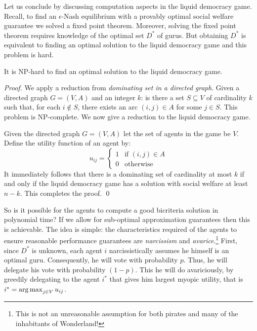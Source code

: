 Let us conclude by discussing computation aspects in the liquid democracy game.
Recall, to find an $\epsilon$-Nash equilibrium with a provably optimal social welfare guarantee
we solved a fixed point theorem. 
Moreover, solving the fixed point theorem requires knowledge of the optimal set $D^*$ of gurus.
But obtaining $D^*$ is equivalent to finding an optimal solution to the liquid democracy game 
and this problem is hard.
\begin{thm}\label{thm:hardness}
It is NP-hard to find an optimal solution to the liquid democracy game.
\end{thm}
\begin{proof}
We apply a reduction from {\em dominating set in a directed graph}. Given a directed 
graph $G=(V,A)$ and an integer $k$: is there a set $S\subseteq V$ of cardinality $k$ such that,
for each $i\notin S$, there exists an arc $(i,j)\in A$ for some $j\in S$. 
This problem is NP-complete. We now give a reduction to the liquid democracy game.

Given the directed graph $G=(V,A)$ let the set of agents in the game be $V$. Define the
utility function of an agent by:
$$
u_{ij} = 
\begin{cases}
1 &\text{if } (i,j)\in A  \\ 
0 & \text{otherwise}	
\end{cases} 
$$ 
It immediately follows that there is a dominating set of cardinality at most $k$ if and only if the
liquid democracy game has a solution with social welfare at least $n-k$.
This completes the proof.
\qed
\end{proof}

So is it possible for the agents to compute a good bicriteria solution in polynomial time? 
If we allow for sub-optimal approximation guarantees then this is achievable.
The idea is simple: the characteristics required of the agents to ensure 
reasonable performance guarantees are {\em narcissism} and {\em avarice}.\footnote{This is not an unreasonable assumption for
both pirates and many of the inhabitants of Wonderland!}
First, since $D^*$ is unknown, each agent $i$ narcissistically assumes he himself is an optimal guru.
Consequently, he will vote with probability $p$. Thus, he will delegate his vote 
with probability $(1-p)$. This he will do avariciously, by greedily delegating to the agent $i^*$
that gives him largest myopic utility, that is $i^*=\operatorname*{arg\,max}_{j\in V} u_{ij}$.


